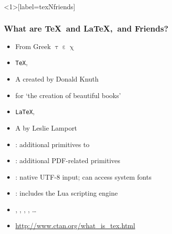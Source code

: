 \begin{frame}<1>[label=texNfriends]
\frametitle{What are \TeX\ and \LaTeX,\ and Friends?}

\begin{description}
\item<1>[\TeX] 
\begin{itemize}
\item From Greek $\uptau\upepsilon\upchi$
\item {} \texttt{TeX}, 
\item A  created by Donald Knuth
\item for `the creation of beautiful books'
\end{itemize}


\item<2>[\LaTeX]
\begin{itemize}
\item {} \texttt{LaTeX}, 
\item A  by Leslie Lamport
	\end{itemize}

\pause

\item<3-4>[Binaries]
	\begin{itemize}
  \item {}: additional primitives to 
	\item {}: additional PDF-related primitives
  \item {}: native UTF-8 input; can access system fonts
	\item {}: includes the Lua scripting engine
\end{itemize}
\item <5>[Friends]
\begin{itemize}
\item {}, , , ,  \ldots
\item \url{http://www.ctan.org/what_is_tex.html}
\end{itemize}
\end{description}
\end{frame}

